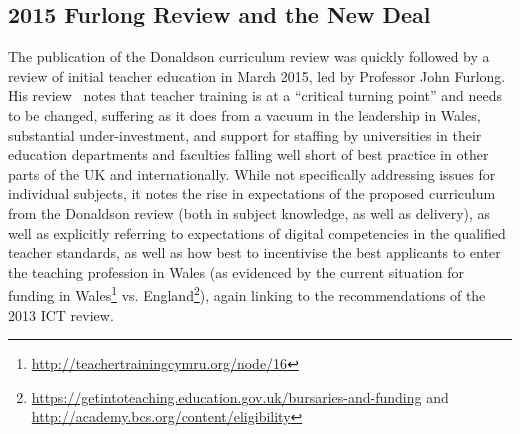 \documentclass{sig-alternate}
\begin{document}

\subsection{2015 Furlong Review and the New Deal}

The publication of the Donaldson curriculum review was quickly
followed by a review of initial teacher education in March 2015, led
by Professor John Furlong. His review~\cite{Furlong:2015} notes
that teacher training is at a ``critical turning point'' and needs
to be changed, 
suffering as it does from
a vacuum in the leadership in Wales, substantial under-investment,
and support for staffing by universities in their
education departments and faculties falling well short of best
practice in other parts of the UK and internationally. While not
specifically addressing issues for individual subjects, it notes the
rise in expectations of the proposed curriculum from the Donaldson
review (both in subject knowledge, as well as delivery), as well as
explicitly referring to expectations of digital competencies in the
qualified teacher standards, as well as how best to incentivise the
best applicants to enter the teaching profession in Wales (as
evidenced by the current situation for funding in
Wales\footnote{\url{http://teachertrainingcymru.org/node/16}}
vs. England\footnote{\url{https://getintoteaching.education.gov.uk/bursaries-and-funding}
and \url{http://academy.bcs.org/content/eligibility}}), again linking
to the recommendations of the 2013 ICT review.
\end{document}
